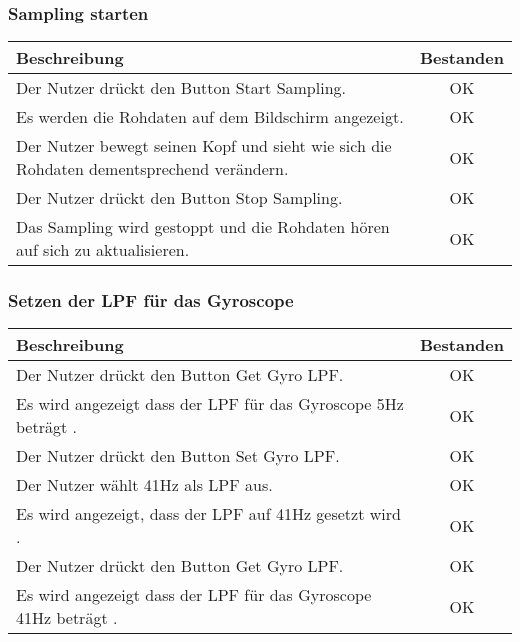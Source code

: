 \documentclass[a4paper,12pt]{article}
\begin{document}
\subsubsection{Sampling starten}
\begin{tabular}{ | p{12cm} | c| }
	\hline
	\textbf{Beschreibung} & \textbf{Bestanden}\\
	\hline
	Der Nutzer drückt den Button \glqq{}Start Sampling\grqq{}. & OK\\
	\hline
	Es werden die Rohdaten auf dem Bildschirm angezeigt. & OK\\
	\hline
	Der Nutzer bewegt seinen Kopf und sieht wie sich die Rohdaten dementsprechend verändern. & OK\\
	\hline
	Der Nutzer drückt den Button \glqq{}Stop Sampling\grqq{}. & OK \\
	\hline
	Das Sampling wird gestoppt und die Rohdaten hören auf sich zu aktualisieren. & OK \\
	\hline
\end{tabular}

\subsubsection{Setzen der LPF für das Gyroscope}
\begin{tabular}{ | p{12cm} | c| }
	\hline
	\textbf{Beschreibung} & \textbf{Bestanden}\\
	\hline
	Der Nutzer drückt den Button \glqq{}Get Gyro LPF\grqq{}. & OK\\
	\hline
	Es wird angezeigt dass der LPF für das Gyroscope 5Hz beträgt . & OK\\
	\hline
	Der Nutzer drückt den Button \glqq{}Set Gyro LPF\grqq{}. & OK\\
	\hline
	Der Nutzer wählt 41Hz als LPF aus. & OK \\
	\hline
	Es wird angezeigt, dass der LPF auf 41Hz gesetzt wird . & OK \\
	\hline
	Der Nutzer drückt den Button \glqq{}Get Gyro LPF\grqq{}. & OK\\
	\hline
	Es wird angezeigt dass der LPF für das Gyroscope 41Hz beträgt . & OK\\
	\hline
\end{tabular}
\end{document}

